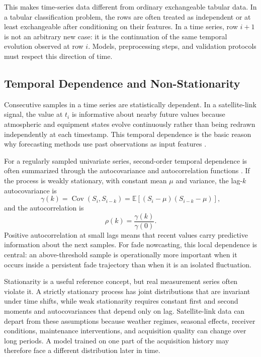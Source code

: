 This makes time-series data different from ordinary exchangeable tabular data.
In a tabular classification problem, the rows are often treated as independent
or at least exchangeable after conditioning on their features. In a time series,
row \(i+1\) is not an arbitrary new case: it is the continuation of the same
temporal evolution observed at row \(i\). Models, preprocessing steps, and
validation protocols must respect this direction of time.

\subsection{Temporal Dependence and Non-Stationarity}

Consecutive samples in a time series are statistically dependent. In a satellite-link
signal, the value at \(t_i\) is informative about nearby future values because
atmospheric and equipment states evolve continuously rather than being redrawn
independently at each timestamp. This temporal dependence is the basic reason
why forecasting methods use past observations as input features
\cite{hyndman2021forecasting}.

For a regularly sampled univariate series, second-order temporal dependence is
often summarized through the autocovariance and autocorrelation functions
\cite{shumway2017time}. If the process is weakly stationary, with constant mean
\(\mu\) and variance, the lag-\(k\) autocovariance is
\[
  \gamma(k)
  =
  \operatorname{Cov}(S_i,S_{i-k})
  =
  \mathbb{E}\left[(S_i-\mu)(S_{i-k}-\mu)\right],
\]
and the autocorrelation is
\[
  \rho(k) = \frac{\gamma(k)}{\gamma(0)} .
\]
Positive autocorrelation at small lags means that recent values carry
predictive information about the next samples. For fade nowcasting, this local
dependence is central: an above-threshold sample is operationally more important
when it occurs inside a persistent fade trajectory than when it is an isolated
fluctuation.

Stationarity is a useful reference concept, but real measurement series often
violate it. A strictly stationary process has joint distributions that are
invariant under time shifts, while weak stationarity requires constant first and
second moments and autocovariances that depend only on lag. Satellite-link data
can depart from these assumptions because weather regimes, seasonal effects,
receiver conditions, maintenance interventions, and acquisition quality can
change over long periods. A model trained on one part of the acquisition history
may therefore face a different distribution later in time.

